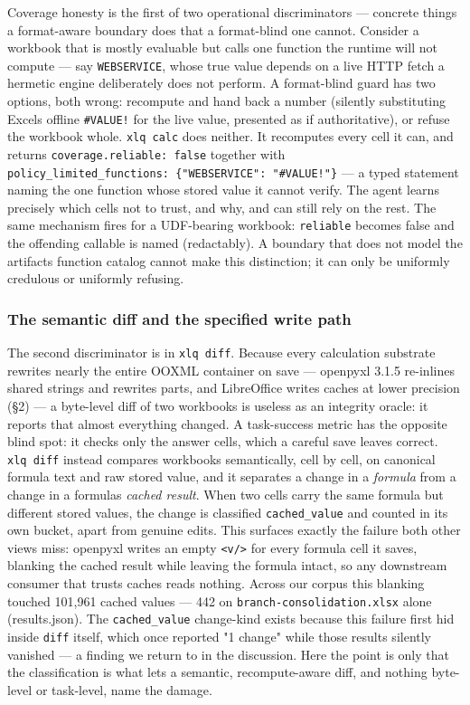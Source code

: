 \documentclass[
]{article}
\begin{document}
Coverage honesty is the first of two operational discriminators ---
concrete things a format-aware boundary does that a format-blind one
cannot. Consider a workbook that is mostly evaluable but calls one
function the runtime will not compute --- say \texttt{WEBSERVICE}, whose
true value depends on a live HTTP fetch a hermetic engine deliberately
does not perform. A format-blind guard has two options, both wrong:
recompute and hand back a number (silently substituting
Excel\textquotesingle s offline \texttt{\#VALUE!} for the live value,
presented as if authoritative), or refuse the workbook whole.
\texttt{xlq\ calc} does neither. It recomputes every cell it can, and
returns \texttt{coverage.reliable:\ false} together with
\texttt{policy\_limited\_functions:\ \{"WEBSERVICE":\ "\#VALUE!"\}} ---
a typed statement naming the one function whose stored value it cannot
verify. The agent learns precisely which cells not to trust, and why,
and can still rely on the rest. The same mechanism fires for a
UDF-bearing workbook: \texttt{reliable} becomes false and the offending
callable is named (redactably). A boundary that does not model the
artifact\textquotesingle s function catalog cannot make this
distinction; it can only be uniformly credulous or uniformly refusing.

\subsubsection{The semantic diff and the specified write
path}\label{the-semantic-diff-and-the-specified-write-path}

The second discriminator is in \texttt{xlq\ diff}. Because every
calculation substrate rewrites nearly the entire OOXML container on save
--- openpyxl 3.1.5 re-inlines shared strings and rewrites parts, and
LibreOffice writes caches at lower precision (§2) --- a byte-level diff
of two workbooks is useless as an integrity oracle: it reports that
almost everything changed. A task-success metric has the opposite blind
spot: it checks only the answer cells, which a careful save leaves
correct. \texttt{xlq\ diff} instead compares workbooks semantically,
cell by cell, on canonical formula text and raw stored value, and it
separates a change in a \emph{formula} from a change in a
formula\textquotesingle s \emph{cached result}. When two cells carry the
same formula but different stored values, the change is classified
\texttt{cached\_value} and counted in its own bucket, apart from genuine
edits. This surfaces exactly the failure both other views miss: openpyxl
writes an empty \texttt{\textless{}v/\textgreater{}} for every formula
cell it saves, blanking the cached result while leaving the formula
intact, so any downstream consumer that trusts caches reads nothing.
Across our corpus this blanking touched 101,961 cached values --- 442 on
\texttt{branch-consolidation.xlsx} alone (results.json). The
\texttt{cached\_value} change-kind exists because this failure first hid
inside \texttt{diff} itself, which once reported "1 change" while those
results silently vanished --- a finding we return to in the discussion.
Here the point is only that the classification is what lets a semantic,
recompute-aware diff, and nothing byte-level or task-level, name the
damage.
\end{document}

